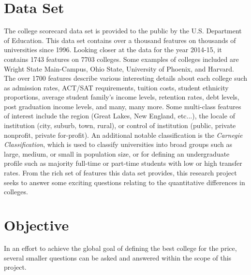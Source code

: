 \documentclass[10pt]{article}
\begin{document}
\section*{Data Set}

The college scorecard data set \cite{collegeScorecard} is provided to the public by the U.S. Department of Education. This data set contains over a thousand features on thousands of universities since 1996. Looking closer at the data for the year 2014-15, it contains 1743 features on 7703 colleges. Some examples of colleges included are Wright State Main-Campus, Ohio State, University of Phoenix, and Harvard. The over 1700 features describe various interesting details about each college such as admission rates, ACT/SAT requirements, tuition costs, student ethnicity proportions, average student family's income levels, retention rates, debt levels, post graduation income levels, and many, many more. Some multi-class features of interest include the region (Great Lakes, New England, etc...), the locale of institution (city, suburb, town, rural), or control of institution (public, private nonprofit, private for-profit). An additional notable classification is the \textit{Carnegie Classification}, which is used to classify universities into broad groups such as large, medium, or small in population size, or for defining an undergraduate profile such as majority full-time or part-time students with low or high transfer rates. From the rich set of features this data set provides, this research project seeks to answer some exciting questions relating to the quantitative differences in colleges.

\section*{Objective}

In an effort to achieve the global goal of defining the best college for the price, several smaller questions can be asked and answered within the scope of this project.
\end{document}
